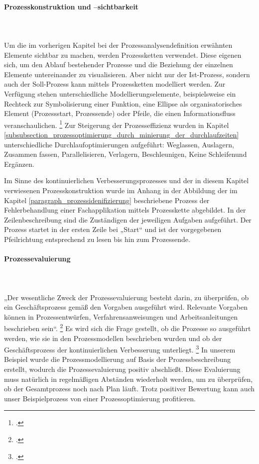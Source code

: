\paragraph{Prozesskonstruktion und –sichtbarkeit}\mbox{}\\\\
\label{paragraph_prozesskonstruktion_und_sichtbarkeit}
Um die im vorherigen Kapitel bei der Prozessanalysendefinition erwähnten Elemente sichtbar zu machen, werden Prozessketten verwendet. Diese eigenen sich, um den Ablauf bestehender Prozesse und die Beziehung der einzelnen Elemente untereinander zu visualisieren. Aber nicht nur der Ist-Prozess, sondern auch der Soll-Prozess kann mittels Prozessketten modelliert werden. Zur Verfügung stehen unterschiedliche Modellierungselemente, beispielsweise ein Rechteck zur Symbolisierung einer Funktion, eine Ellipse als organisatorisches Element (Prozessstart, Prozessende) oder Pfeile, die einen Informationsfluss veranschaulichen. \footcite[Vgl.][64]{krcmar_einfuhrung_2015} Zur Steigerung der Prozesseffizienz wurden in Kapitel \ref{subsubsection_prozessoptimierung_durch_minierung_der_durchlaufzeiten} unterschiedliche Durchlaufoptimierungen aufgeführt: \glqq Weglassen\grqq, \glqq Auslagern\grqq, \glqq Zusammen fassen\grqq, \glqq Parallelisieren\grqq, \glqq Verlagern\grqq, \glqq Beschleunigen\grqq, \glqq Keine Schleifen\grqq und \glqq Ergänzen\grqq.

Im Sinne des kontinuierlichen Verbesserungsprozesses und der in diesem Kapitel verwiesenen Prozesskonstruktion wurde im Anhang in der Abbildung \glqq{}\grqq{} der im Kapitel \ref{paragraph_prozessidenifizierung} beschriebene Prozess der Fehlerbehandlung einer Fachapplikation mittels Prozesskette abgebildet. In der Zeilenbeschreibung sind die Zuständigen der jeweiligen Aufgaben aufgeführt. Der Prozess startet in der ersten Zeile bei „Start“ und ist der vorgegebenen Pfeilrichtung entsprechend zu lesen bis hin zum Prozessende.

\paragraph{Prozessevaluierung}\mbox{}\\\\
„Der wesentliche Zweck der Prozessevaluierung besteht darin, zu überprüfen, ob ein Geschäftsprozess gemäß den Vorgaben ausgeführt wird. Relevante Vorgaben können in Prozessentwürfen, Verfahrensanweisungen und Arbeitsanleitungen beschrieben sein“. \footcite[277]{heinrich_stelzer_2011} Es wird sich die Frage gestellt, ob die Prozesse so ausgeführt werden, wie sie in den Prozessmodellen beschrieben wurden und ob der Geschäftsprozess der kontinuierlichen Verbesserung unterliegt. \footcite[Vgl.][277]{heinrich_stelzer_2011} In unserem Beispiel wurde die Prozessmodellierung auf Basis der Prozessbeschreibung erstellt, wodurch die Prozessevaluierung positiv abschließt. Diese Evaluierung muss natürlich in regelmäßigen Abständen wiederholt werden, um zu überprüfen, ob der Gesamtprozess noch nach Plan läuft. Trotz positiver Bewertung kann auch unser Beispielprozess von einer Prozessoptimierung profitieren.

